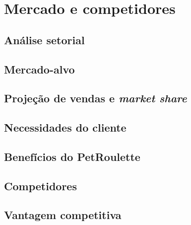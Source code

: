 \chapter{Mercado e competidores} 

\section{Análise setorial}

\section{Mercado-alvo}

\section{Projeção de vendas e \textit{market share}}

\section{Necessidades do cliente}

\section{Benefícios do PetRoulette}

\section{Competidores}

\section{Vantagem competitiva}
